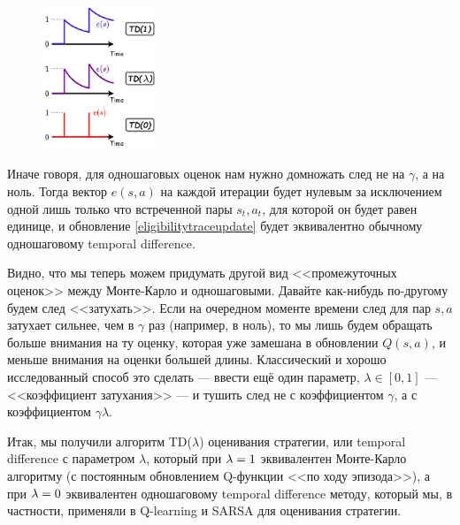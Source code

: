 \begin{figure}
\centering
\includegraphics[width=0.3\textwidth]{Images/Traces.png}
\vspace{-0.5cm}
\end{figure}

Иначе говоря, для одношаговых оценок нам нужно домножать след не на $\gamma$, а на ноль. Тогда вектор $e(s, a)$ на каждой итерации будет нулевым за исключением одной лишь только что встреченной пары $s_t, a_t$, для которой он будет равен единице, и обновление \ref{eligibilitytraceupdate} будет эквивалентно обычному одношаговому temporal difference.

Видно, что мы теперь можем придумать другой вид <<промежуточных оценок>> между Монте-Карло и одношаговыми. Давайте как-нибудь по-другому будем след <<затухать>>. Если на очередном моменте времени след для пар $s, a$ затухает сильнее, чем в $\gamma$ раз (например, в ноль), то мы лишь будем обращать больше внимания на ту оценку, которая уже замешана в обновлении $Q(s, a)$, и меньше внимания на оценки большей длины. Классический и хорошо исследованный способ это сделать --- ввести ещё один параметр, $\lambda \in [0, 1]$ --- <<коэффициент затухания>> --- и тушить след не с коэффициентом $\gamma$, а с коэффициентом $\gamma \lambda$.

Итак, мы получили алгоритм TD($\lambda$) оценивания стратегии, или temporal difference с параметром $\lambda$, который при $\lambda \HM= 1$ эквивалентен Монте-Карло алгоритму (с постоянным обновлением Q-функции <<по ходу эпизода>>), а при $\lambda \HM = 0$ эквивалентен одношаговому temporal difference методу, который мы, в частности, применяли в Q-learning и SARSA для оценивания стратегии.


